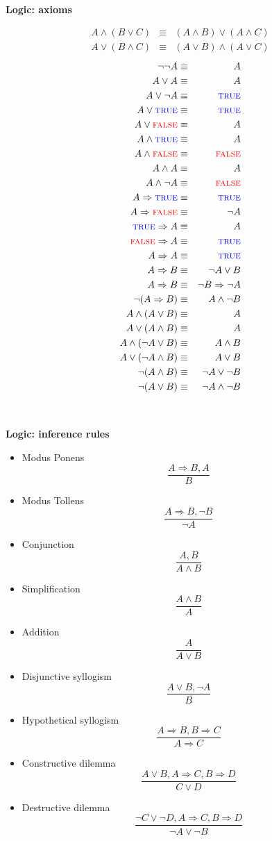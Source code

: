 \documentclass{article}
\newcommand{\bi}{\begin{itemize}}
\newcommand{\ii}{\item}
\newcommand{\ei}{\end{itemize}}
\newcommand{\ti}[1]{
\mbox{~}

\vspace{1.25in}
\centerline{\bf #1}}
\newcommand{\true}{\mbox{\sc \color{blue} true}}
\newcommand{\false}{\mbox{\sc \color{red} false}}
\begin{document}
\newpage

\ti{Logic: axioms}
\LARGE
\newcommand{\eq}{&\equiv&}
\newcommand{\imp}{\Rightarrow}

\begin{multicols}{2}
\begin{eqnarray*}
A\land(B\lor C) \eq  (A\land B) \lor (A \land C)\\
A\lor(B\land C) \eq  (A\lor B) \land (A \lor C)
\end{eqnarray*}
\begin{eqnarray*}
\neg \neg A \eq A\\
A\lor A \eq A\\
A\lor \neg A \eq \true\\
A\lor \true \eq \true\\
A\lor \false \eq A\\
A\land \true \eq A\\
A\land \false \eq \false\\
A\land A \eq A\\
A\land \neg A \eq \false\\
A\imp \true \eq \true\\
A\imp \false \eq \neg A\\
\true\imp A \eq A\\
\false \imp A \eq \true\\
A\imp A \eq \true\\
A\imp B \eq \neg A \lor B\\
A\imp B \eq \neg B \imp \neg A\\
\neg(A\imp B) \eq A \land \neg B\\
A\land(A\lor B) \eq A\\
A\lor(A\land B) \eq A\\
A\land(\neg A \lor B) \eq A \land B\\
A \lor (\neg A \land B) \eq A \lor B\\
\neg(A\land B) \eq \neg A \lor \neg B\\
\neg(A\lor B) \eq \neg A \land \neg B
\end{eqnarray*}

\end{multicols}
\huge

\newpage
\ti{Logic: inference rules}
\begin{multicols}{2}
\bi
\ii Modus Ponens
\[
\frac{A\imp B, A}{B}
\]
\ii Modus Tollens
\[
\frac{A\imp B, \neg B}{\neg A}
\]
\ii Conjunction
\[
\frac{A,B}{A\land B}
\]
\ii Simplification
\[
\frac{A\land B}{A}
\]
\ii Addition
\[
\frac{A}{A\lor B}
\]
\ii Disjunctive syllogism
\[
\frac{A\lor B, \neg A}{B}
\]
\ii Hypothetical syllogism
\[
\frac{A\imp B, B\imp C}{A\imp C}
\]
\ii Constructive dilemma
\[
\frac{A\lor B, A\imp C, B\imp D}{C\lor D}
\]
\ii Destructive dilemma
\[
\frac{\neg C\lor \neg D, A\imp C, B\imp D}{\neg A \lor \neg B}
\]
\ei
\end{multicols}
\end{document}
